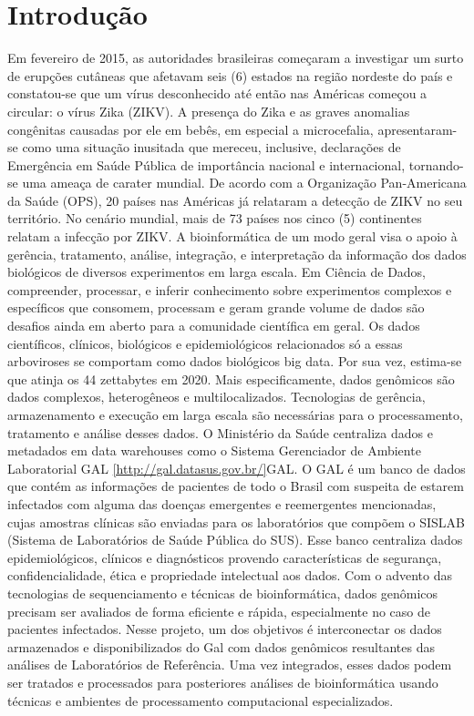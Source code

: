 \chapter{Introdução}

Em fevereiro de 2015, as autoridades brasileiras começaram a investigar um surto de erupções cutâneas que afetavam seis (6) estados na região nordeste do país e constatou-se que um vírus desconhecido até então nas Américas começou a circular: o vírus Zika (ZIKV). A presença do Zika e as graves anomalias congênitas causadas por ele em bebês, em especial a microcefalia, apresentaram-se como uma situação inusitada que mereceu, inclusive, declarações de Emergência em Saúde Pública de importância nacional e internacional, tornando-se uma ameaça de carater mundial.
De acordo com a Organização Pan-Americana da Saúde (OPS), 20 países nas Américas  já relataram a detecção de ZIKV no seu território. No cenário mundial, mais de 73 países nos cinco (5) continentes relatam a infecção por ZIKV.
A bioinformática de um modo geral visa o apoio à gerência, tratamento, análise, integração, e interpretação da informação dos dados biológicos de diversos experimentos em larga escala. Em Ciência de Dados, compreender, processar, e inferir conhecimento sobre experimentos complexos e específicos que consomem, processam e geram grande volume de dados são desafios ainda em aberto para a comunidade científica em geral. Os dados científicos, clínicos, biológicos e epidemiológicos relacionados só a essas arboviroses se comportam como dados biológicos big data. Por sua vez, estima-se que atinja os 44 zettabytes em 2020. Mais especificamente, dados genômicos são dados complexos, heterogêneos e multilocalizados. Tecnologias de gerência, armazenamento e execução em larga escala são necessárias para o processamento, tratamento e análise desses dados.
O Ministério da Saúde centraliza dados e metadados em data warehouses como o Sistema Gerenciador de Ambiente Laboratorial GAL \ref{http://gal.datasus.gov.br/}{GAL}.
O GAL é um banco de dados que contém as informações de pacientes de todo o Brasil com suspeita de estarem infectados com alguma das doenças emergentes e reemergentes mencionadas, cujas amostras clínicas são enviadas para os laboratórios que compõem o SISLAB (Sistema de Laboratórios de Saúde Pública do SUS). Esse banco centraliza dados epidemiológicos, clínicos e diagnósticos provendo características de segurança, confidencialidade, ética e propriedade intelectual aos dados.
Com o advento das tecnologias de sequenciamento e técnicas de bioinformática, dados genômicos precisam ser avaliados de forma eficiente e rápida, especialmente no caso de pacientes infectados. Nesse projeto, um dos objetivos é interconectar os dados armazenados e disponibilizados do Gal com dados genômicos resultantes das análises de Laboratórios de Referência. Uma vez integrados, esses dados podem ser tratados e processados para posteriores análises de bioinformática usando técnicas e ambientes de processamento computacional especializados.